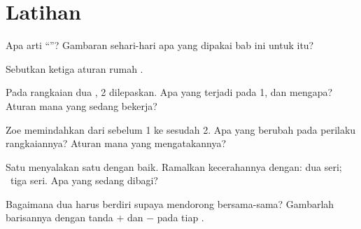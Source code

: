\section{Latihan}

\begin{exercise}[$\star$]\label{exo:g4:series-circuits:1}
Apa arti ``''? Gambaran sehari-hari apa yang dipakai bab
ini untuk itu?
\end{exercise}

\begin{exercise}[$\star$]\label{exo:g4:series-circuits:2}
Sebutkan ketiga aturan rumah .
\end{exercise}

\begin{exercise}[$\star$]\label{exo:g4:series-circuits:3}
Pada rangkaian dua ,  2 dilepaskan. Apa yang terjadi pada
 1, dan mengapa? Aturan mana yang sedang bekerja?
\end{exercise}

\begin{exercise}[$\star$]\label{exo:g4:series-circuits:4}
Zoe memindahkan  dari sebelum  1 ke sesudah  2.
Apa yang berubah pada perilaku rangkaiannya? Aturan mana yang
mengatakannya?
\end{exercise}

\begin{exercise}[$\star$]\label{exo:g4:series-circuits:5}
Satu  menyalakan satu  dengan baik. Ramalkan kecerahannya
dengan: dua  seri; \ tiga  seri. Apa yang sedang dibagi?
\end{exercise}

\begin{exercise}[$\star$]\label{exo:g4:series-circuits:6}
Bagaimana dua  harus berdiri supaya mendorong bersama-sama?
Gambarlah barisannya dengan tanda $+$ dan $-$ pada tiap .
\end{exercise}

